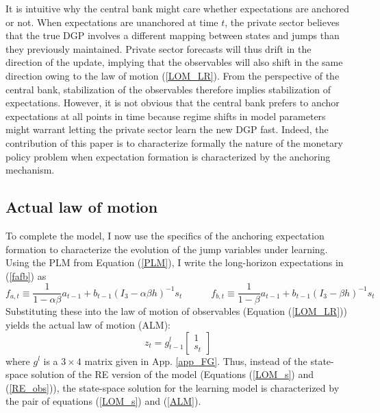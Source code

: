 \documentclass[11pt]{article}
\renewcommand{\[}{\begin{equation}}
\renewcommand{\]}{\end{equation}}
\begin{document}
It is intuitive why the central bank might care whether expectations are anchored or not. When expectations are unanchored at time $t$, the private sector believes that the true DGP involves a different mapping between states and jumps than they previously maintained. Private sector forecasts will thus drift in the direction of the update, implying that the observables will also shift in the same direction owing to the law of motion (\ref{LOM_LR}). From the perspective of the central bank, stabilization of the observables therefore implies stabilization of expectations. However, it is not obvious that the central bank prefers to anchor expectations at all points in time because regime shifts in model parameters might warrant letting the private sector learn the new DGP fast. Indeed, the contribution of this paper is to characterize formally the nature of the monetary policy problem when expectation formation is characterized by the  anchoring mechanism.

\subsection{Actual law of motion}
To complete the model, I now use the specifics of the anchoring expectation formation to characterize the evolution of the jump variables under learning. Using the PLM from Equation (\ref{PLM}), I write the long-horizon expectations in (\ref{fafb}) as
\begin{equation}
f_{a,t} \equiv \frac{1}{1-\alpha\beta}a_{t-1}  + b_{t-1}(I_3 - \alpha\beta h)^{-1}s_t \quad \quad \quad f_{b,t} \equiv \frac{1}{1-\beta}a_{t-1}  + b_{t-1}(I_3 - \beta h)^{-1}s_t  \label{fafb_anal}
\end{equation}
Substituting these into the law of motion of observables (Equation (\ref{LOM_LR})) yields the actual law of motion (ALM):
\begin{equation}
z_t = g_{t-1}^l \begin{bmatrix} 1 \\ s_t
\end{bmatrix}
\label{ALM}
\end{equation}
where $g^l$ is a $3\times4$ matrix given in App. \ref{app_FG}. Thus, instead of the state-space solution of the RE version of the model (Equations (\ref{LOM_s}) and (\ref{RE_obs})), the state-space solution for the learning model is characterized by the pair of equations (\ref{LOM_s}) and (\ref{ALM}). 


\end{document}
